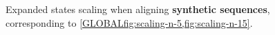\begin{figure}[t]
  \centering
  \hfill
  \caption{Expanded states scaling when aligning \textbf{synthetic sequences},
    corresponding to \cref{GLOBALfig:scaling-n-5,fig:scaling-n-15}.
    }
  \label{GLOBALfig:expanded}
\end{figure}
